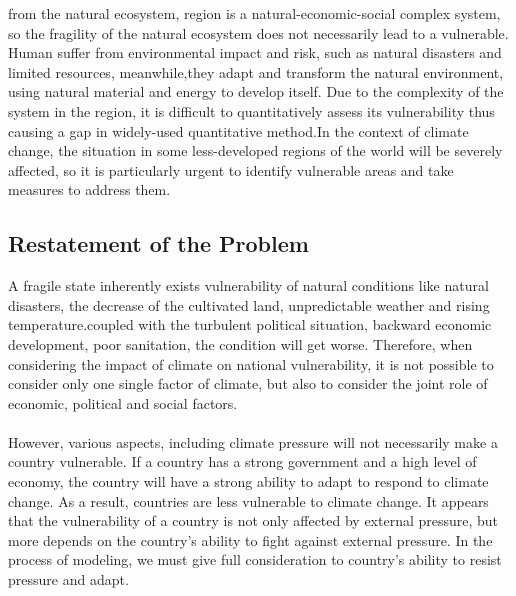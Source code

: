 \documentclass{mcmthesis}
\begin{document}
from the natural ecosystem, region is a natural-economic-social complex 
system, so the fragility of the natural ecosystem does not necessarily lead 
to a vulnerable. Human suffer from environmental impact and risk, such as 
natural disasters and limited resources, meanwhile,they adapt and transform 
the natural environment, using natural material and energy to develop itself.
Due to the complexity of the system in the region, it is difficult to 
quantitatively assess its vulnerability thus causing a gap in widely-used 
quantitative method.In the context of climate change, the situation in some
less-developed regions of the world will be severely affected, so it is 
particularly urgent to identify vulnerable areas and take measures to 
address them.


\subsection{Restatement of the Problem}
A fragile state inherently exists vulnerability of natural conditions 
like natural disasters, the decrease of the cultivated land, unpredictable 
weather and rising temperature.coupled with the turbulent political situation, 
backward economic development, poor sanitation, the condition will get worse. 
Therefore, when considering the impact of climate on national vulnerability, 
it is not possible to consider only one single factor of climate, but also to
consider the joint role of economic, political and social factors.\\\\
However, various aspects, including climate pressure will not necessarily 
make a country vulnerable. If a country has a strong government and a high 
level of economy, the country will have a strong ability to adapt to respond
to climate change. As a result, countries are less vulnerable to climate 
change. It appears that the vulnerability of a country is not only affected
by external pressure, but more depends on the country's ability to fight 
against external pressure. In the process of modeling, we must give full 
consideration to country's ability to resist pressure and adapt.
\end{document}
